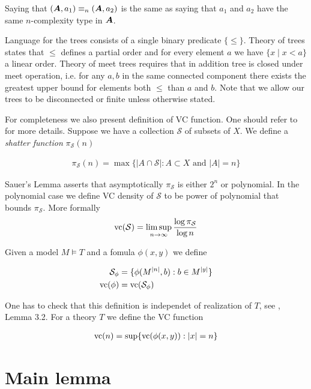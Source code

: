 \documentclass{amsart}
\DeclareMathOperator{\A}{\boldface A}
\newcommand{\CS}{\mathcal S}
\begin{document}
\begin{Note}
	Saying that $(\A, a_1) \equiv_n (\A, a_2)$ is the same as saying that $a_1$ and $a_2$ have the same $n$-complexity type in $\A$.
\end{Note}

Language for the trees consists of a single binary predicate $\{\leq\}$. Theory of trees states that $\leq$ defines a partial order and for every element $a$ we have $\{x \mid x < a\}$ a linear order. Theory of meet trees requires that in addition tree is closed under meet operation, i.e. for any $a, b$ in the same connected component there exists the greatest upper bound for elements both $\leq$ than $a$ and $b$. Note that we allow our trees to be disconnected or finite unless otherwise stated.

For completeness we also present definition of VC function.
One should refer to \cite{vc_density} for more details.
Suppose we have a collection $\CS$ of subsets of $X$. We define a \emph{shatter function} $\pi_\CS(n)$

\begin{align*}
	\pi_\CS(n) = \max \{|A \cap \CS| : A \subset X \text{ and } |A| = n\}
\end{align*}

Sauer's Lemma asserts that asymptotically $\pi_\CS$ is either $2^n$ or polynomial.
In the polynomial case we define VC density of $\CS$ to be power of polynomial that bounds $\pi_\CS$.
More formally 
\begin{align*}
	\vc(\CS) = \limsup_{n \to \infty}\frac{\log \pi_\CS}{\log n}
\end{align*}

Given a model $M \models T$ and a fomula $\phi(x, y)$ we define 

\begin{align*}
	\CS_\phi &= \{\phi(M^{|n|}, b) : b \in M^{|y|}\} \\
	\vc(\phi) &=  \vc(\CS_\phi)
\end{align*}

One has to check that this definition is independet of realization of $T$, see \cite{vc_density}, Lemma 3.2. For a theory $T$ we define the VC function

\begin{align*}
	\operatorname{vc}(n) = \sup \{\operatorname{vc}(\phi(x, y)) : |x| = n\}
\end{align*}

\section{Main lemma}
\end{document}
